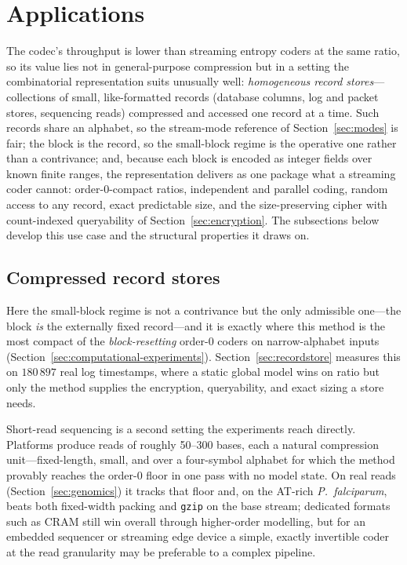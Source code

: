 \documentclass[entropy,article,submit,oneauthor,pdftex]{Definitions/mdpi}
\begin{document}
\section{Applications}\label{sec:applications}
The codec's throughput is lower than streaming entropy coders at the same ratio,
so its value lies not in general-purpose compression but in a setting the
combinatorial representation suits unusually well: \emph{homogeneous record
stores}---collections of small, like-formatted records (database columns, log and
packet stores, sequencing reads) compressed and accessed one record at a time. Such
records share an alphabet, so the stream-mode reference of
Section~\ref{sec:modes} is fair; the block is the record, so the small-block regime
is the operative one rather than a contrivance; and, because each block is encoded as
integer fields over known finite ranges, the representation delivers as one package what a
streaming coder cannot: order-$0$-compact ratios, independent and parallel coding,
random access to any record, exact predictable size, and the size-preserving
cipher with count-indexed queryability of Section~\ref{sec:encryption}. The subsections below
develop this use case and the structural properties it draws on.

\subsection{Compressed record stores}
Here the small-block regime is not a contrivance but the only admissible one---the block
\emph{is} the externally fixed record---and it is exactly where this method is the most
compact of the \emph{block-resetting} order-$0$ coders on narrow-alphabet inputs
(Section~\ref{sec:computational-experiments}). Section~\ref{sec:recordstore} measures this on
$180\,897$ real log timestamps, where a static global model wins on ratio but only the
method supplies the encryption, queryability, and exact sizing a store needs.

Short-read sequencing is a second setting the experiments reach directly. Platforms
produce reads of roughly 50--300 bases, each a natural compression unit---fixed-length,
small, and over a four-symbol alphabet for which the method provably reaches the
order-$0$ floor in one pass with no model state. On real reads
(Section~\ref{sec:genomics}) it tracks that floor and, on the AT-rich
\emph{P.\ falciparum}, beats both fixed-width packing and \texttt{gzip} on the base
stream; dedicated formats such as CRAM still win overall through higher-order modelling,
but for an embedded sequencer or streaming edge device a simple, exactly invertible
coder at the read granularity may be preferable to a complex pipeline.
\end{document}
